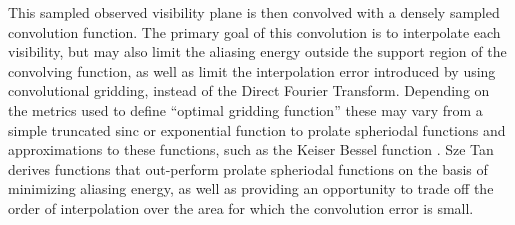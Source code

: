  
%  
 
 This sampled observed visibility plane is then convolved with a densely sampled convolution function. The primary goal of this convolution is to interpolate each visibility, but may also limit the aliasing energy outside the support 
 region of the convolving function, as well as limit the interpolation error introduced by using convolutional gridding, instead of the Direct Fourier Transform. Depending on the metrics used to define ``optimal gridding function'' these may vary from a simple truncated sinc or exponential function 
 \cite[Lecture 7]{taylor1999synthesis} to prolate spheriodal functions and approximations to these functions, such as the Keiser Bessel function \cite{jackson1991selection}. Sze Tan \cite{tan1986aperture} derives functions that out-perform prolate spheriodal functions
 on the basis of minimizing aliasing energy, as well as providing an opportunity to trade off the order of interpolation over the area for which the convolution error is small.
 
